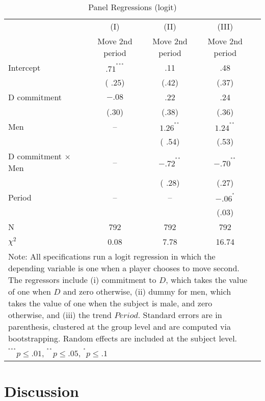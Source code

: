 \documentclass[12pt, letterpaper]{article}
\theoremstyle{plain}
\begin{document}
\begin{table}[ht]
\centering
\caption{Panel Regressions (logit)}
\footnotesize
\begin{tabular}{lcccc}

  & (I) & (II) & (III) \\
&  Move 2nd period &  Move 2nd period & Move 2nd period\\
    \hline
Intercept &  $.71^{^{***}}$ & .11 & .48\\
& ( .25) & (.42) & (.37) \\
D commitment & $-.08$ & .22& .24\\
& (.30) & (.38) & (.36) \\
Men & -- &  $1.26^{^{**}}$ &  $1.24^{^{**}}$\\
& & ( .54) & (.53) \\
D commitment $\times$ Men & -- & $-.72^{^{**}}$ & $-.70^{^{**}}$\\
& & ( .28) & (.27) \\
Period & -- & --& $-.06^{^{*}}$\\
& & & (.03) \\

\hline
N & 792 & 792 & 792 \\ 
$\chi^2$ &  0.08  &  7.78 &  16.74\\
\hline
\hline
 \multicolumn{4}{p{.8\textwidth}}{\scriptsize{Note: All specifications run a logit regression in which the depending variable is one when a player chooses to move second. The regressors include (i) commitment to $D$, which takes the value of one when $D$ and zero otherwise, (ii) dummy for men, which takes the value of one when the subject is male, and zero otherwise, and (iii) the trend $Period$. Standard errors are in parenthesis, clustered at the group level and are computed via bootstrapping. Random effects are included at the subject level. }}\\ 
 \multicolumn{4}{p{0.4\textwidth}}{\scriptsize{ $^{^{***}}p\leq.01$,
    $^{^{**}}p\leq.05$, $^{^{*}}p\leq.1$}} \\
\end{tabular}
\label{table:move_cge}
\end{table}


\section{Discussion}
\label{sec:discuss}
\end{document}
